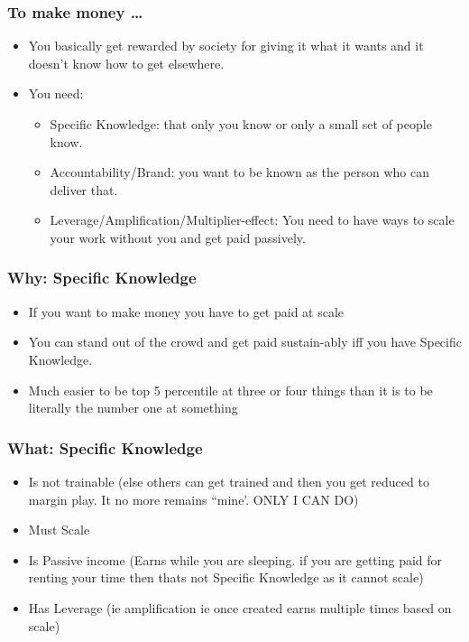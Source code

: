 \begin{frame}[fragile]
\frametitle{To make money \ldots}
\begin{itemize}
\item You basically get rewarded by society for giving it what it wants and it doesn’t know how to get elsewhere.
\item You need:
\begin{itemize}
\item Specific Knowledge: that only you know or only a small set of people know.
\item Accountability/Brand: you want to be known as the person who can deliver that.
\item Leverage/Amplification/Multiplier-effect: You need to have ways to scale your work without you and get paid passively.
\end{itemize}
\end{itemize}
\end{frame}

\begin{frame}[fragile]
\frametitle{Why: Specific Knowledge}
\begin{itemize}
\item If you want to make money you have to get paid at scale
\item You can stand out of the crowd and get paid sustain-ably iff you have Specific Knowledge.
\item  Much easier to be top 5 percentile at three or four things than it is to be literally the number one at something
\end{itemize}
\end{frame}

\begin{frame}[fragile]
\frametitle{What: Specific Knowledge}
\begin{itemize}
\item Is not trainable (else others can get trained and then you get reduced to margin play. It no more remains ``mine'. ONLY I CAN DO)
\item Must Scale
\item Is Passive income (Earns while you are sleeping. if you are getting paid for renting your time then thats not Specific Knowledge as it cannot scale)
\item Has Leverage (ie amplification ie once created earns multiple times based on scale)
\end{itemize}
\end{frame}


